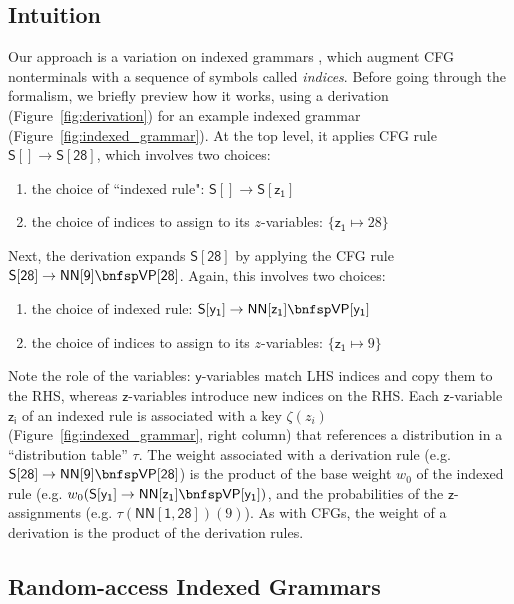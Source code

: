 \documentclass[11pt]{article}
\renewcommand{\bnfpn}[1]{\mathsf{#1}}
\renewcommand{\bnfpo}{\rightarrow}
\begin{document}
\subsection{Intuition}

Our approach is a variation on indexed grammars \cite{aho1968indexed,hopcroft2001introduction}, which augment CFG nonterminals with a sequence of symbols called \emph{indices}. Before going through the formalism, we briefly preview how it works, using a derivation (Figure~\ref{fig:derivation}) for an example indexed grammar (Figure~\ref{fig:indexed_grammar}). At the top level, it applies CFG rule $\bnfpn{S[]} \bnfpo \bnfpn{S[28]}$, which involves two choices: 
\begin{enumerate}
	\item the choice of ``indexed rule": $\bnfpn{S[]} \bnfpo \bnfpn{S[z_1]}$
	\item the choice of indices to assign to its $z$-variables:  $\{ \bnfpn{z_1} \mapsto 28 \}$
\end{enumerate}
Next, the derivation expands $\bnfpn{S[28]}$ by applying the CFG rule $\bnfpn{S[28]} \bnfpo \bnfpn{NN[9]} \bnfsp \bnfpn{VP[28]}$. Again, this involves two choices: 
\begin{enumerate}
	\item the choice of indexed rule: $\bnfpn{S[y_1]} \bnfpo \bnfpn{NN[z_1]} \bnfsp \bnfpn{VP[y_1]}$
	\item the choice of indices to assign to its $z$-variables: $\{ \bnfpn{z_1} \mapsto 9 \}$
\end{enumerate}
Note the role of the variables: $\bnfpn{y}$-variables match LHS indices and copy them to the RHS, whereas $\bnfpn{z}$-variables introduce new indices on the RHS. Each $\bnfpn{z}$-variable $\bnfpn{z_i}$ of an indexed rule is associated with a key $\zeta(z_i)$ (Figure~\ref{fig:indexed_grammar}, right column) that references a distribution in a ``distribution table'' $\tau$. The weight associated with a derivation rule (e.g. $\bnfpn{S[28]} \bnfpo \bnfpn{NN[9]} \bnfsp \bnfpn{VP[28]}$) is the product of the base weight $w_0$ of the indexed rule (e.g. $w_0(\bnfpn{S[y_1]} \bnfpo \bnfpn{NN[z_1]} \bnfsp \bnfpn{VP[y_1]})$, and the probabilities of the $\bnfpn{z}$-assignments (e.g. $\tau(\mathsf{NN[1,28]})(9)$). As with CFGs, the weight of a derivation is the product of the derivation rules.




\subsection{Random-access Indexed Grammars}
\end{document}
